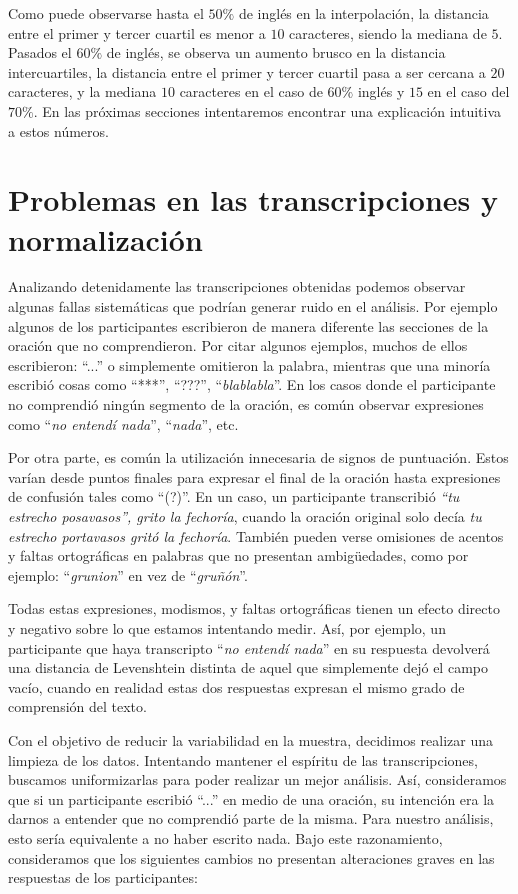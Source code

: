 Como puede observarse hasta el $50\%$ de inglés en la interpolación, la distancia entre el primer y tercer cuartil es menor a $10$ caracteres, siendo la mediana de $5$. Pasados el $60\%$ de inglés, se observa un aumento brusco en la distancia intercuartiles, la distancia entre el primer y tercer cuartil pasa a ser cercana a $20$ caracteres, y la mediana $10$ caracteres en el caso de $60\%$ inglés y $15$ en el caso del $70\%$. En las próximas secciones intentaremos encontrar una explicación intuitiva a estos números.

\section{Problemas en las transcripciones y normalización}\label{transcriptProblemsAndNorm}

Analizando detenidamente las transcripciones obtenidas podemos observar algunas fallas sistemáticas que podrían generar ruido en el análisis. Por ejemplo algunos de los participantes escribieron de manera diferente las secciones de la oración que no comprendieron. Por citar algunos ejemplos, muchos de ellos escribieron: ``...'' o simplemente omitieron la palabra, mientras que una minoría escribió cosas como ``***'', ``???'', ``\textit{blablabla}''. En los casos donde el participante no comprendió ningún segmento de la oración, es común observar expresiones como ``\textit{no entendí nada}'', ``\textit{nada}'', etc.

Por otra parte, es común la utilización innecesaria de signos de puntuación. Estos varían desde puntos finales para expresar el final de la oración hasta expresiones de confusión tales como ``(?)''. En un caso, un participante transcribió \textit{``tu estrecho posavasos'', grito la fechoría}, cuando la oración original solo decía \textit{tu estrecho portavasos gritó la fechoría}.
También pueden verse omisiones de acentos y faltas ortográficas en palabras que no presentan ambigüedades, como por ejemplo: ``\textit{grunion}'' en vez de ``\textit{gruñón}''.

Todas estas expresiones, modismos, y faltas ortográficas tienen un efecto directo y negativo sobre lo que estamos intentando medir. Así, por ejemplo, un participante que haya transcripto ``\textit{no entendí nada}'' en su respuesta devolverá una distancia de Levenshtein distinta de aquel que simplemente dejó el campo vacío, cuando en realidad estas dos respuestas expresan el mismo grado de comprensión del texto.

Con el objetivo de reducir la variabilidad en la muestra, decidimos realizar una limpieza de los datos. Intentando mantener el espíritu de las transcripciones, buscamos uniformizarlas para poder realizar un mejor análisis. Así, consideramos que si un participante escribió ``...'' en medio de una oración, su intención era la darnos a entender que no comprendió parte de la misma. Para nuestro análisis, esto sería equivalente a no haber escrito nada. Bajo este razonamiento, consideramos que los siguientes cambios no presentan alteraciones graves en las respuestas de los participantes:

